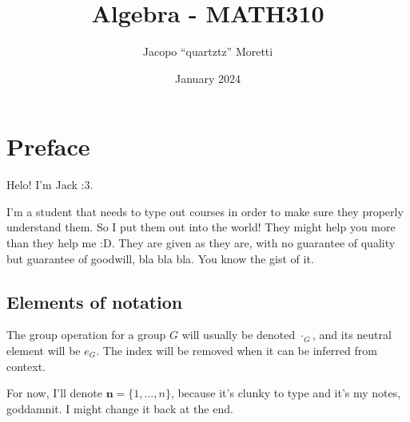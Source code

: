 \documentclass{report} %
\title{Algebra - MATH310}
\author{Jacopo ``quartztz'' Moretti}
\date{January 2024}
\begin{document}
  \maketitle

  \chapter*{Preface}
  Helo! I'm Jack :3.

  I'm a student that needs to type out courses in order to make sure they properly understand them. So I put them out into the world! They might help you more than they help me :D. They are given as they are, with no guarantee of quality but guarantee of goodwill, bla bla bla. You know the gist of it. 

  \section*{Elements of notation}

  The group operation for a group $G$ will usually be denoted $\cdot_G$, and its neutral element will be $e_G$. The index will be removed when it can be inferred from context. 

  For now, I'll denote $\mathbf{n} = \{1, ..., n\}$, because it's clunky to type and it's my notes, goddamnit. I might change it back at the end.

  \tableofcontents

  \pagebreak

  

  
  
  

  \appendix
  
  
  
\end{document}
